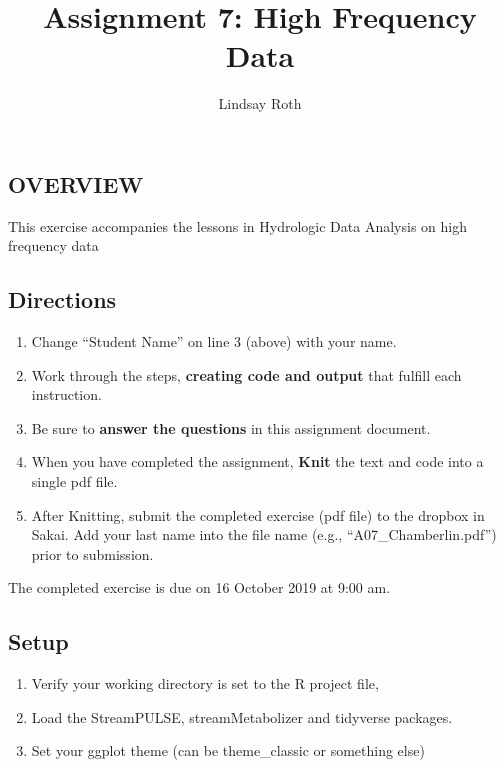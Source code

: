 \documentclass[]{article}
\title{Assignment 7: High Frequency Data}
\author{Lindsay Roth}
\date{}
\providecommand{\tightlist}{%
  \setlength{\itemsep}{0pt}\setlength{\parskip}{0pt}}
\begin{document}
\maketitle

\hypertarget{overview}{%
\subsection{OVERVIEW}\label{overview}}

This exercise accompanies the lessons in Hydrologic Data Analysis on
high frequency data

\hypertarget{directions}{%
\subsection{Directions}\label{directions}}

\begin{enumerate}
\def\labelenumi{\arabic{enumi}.}
\tightlist
\item
  Change ``Student Name'' on line 3 (above) with your name.
\item
  Work through the steps, \textbf{creating code and output} that fulfill
  each instruction.
\item
  Be sure to \textbf{answer the questions} in this assignment document.
\item
  When you have completed the assignment, \textbf{Knit} the text and
  code into a single pdf file.
\item
  After Knitting, submit the completed exercise (pdf file) to the
  dropbox in Sakai. Add your last name into the file name (e.g.,
  ``A07\_Chamberlin.pdf'') prior to submission.
\end{enumerate}

The completed exercise is due on 16 October 2019 at 9:00 am.

\hypertarget{setup}{%
\subsection{Setup}\label{setup}}

\begin{enumerate}
\def\labelenumi{\arabic{enumi}.}
\tightlist
\item
  Verify your working directory is set to the R project file,
\item
  Load the StreamPULSE, streamMetabolizer and tidyverse packages.
\item
  Set your ggplot theme (can be theme\_classic or something else)
\end{enumerate}
\end{document}
